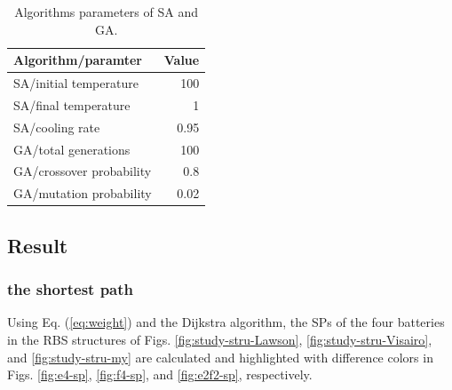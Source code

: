 \documentclass{article}
\begin{document}
\begin{table}[htbp]
  \centering
  \caption{Algorithms parameters of SA and GA.}
    \begin{tabular}{lr}
    \toprule
    Algorithm/paramter & \multicolumn{1}{l}{Value} \\
    \midrule
    SA/initial temperature & 100 \\
    SA/final temperature & 1 \\
    SA/cooling rate & 0.95 \\
    GA/total generations & 100 \\
    GA/crossover probability & 0.8 \\
    GA/mutation probability & 0.02 \\
    \bottomrule
    \end{tabular}
  \label{tab:algorithm-parameter}
\end{table}

\subsection{Result}

\subsubsection{the shortest path}

Using Eq. (\ref{eq:weight}) and the Dijkstra algorithm, the SPs of the four batteries in the RBS structures of Figs. \ref{fig:study-stru-Lawson}, \ref{fig:study-stru-Visairo}, and \ref{fig:study-stru-my} are calculated and highlighted with difference colors in Figs. \ref{fig:e4-sp}, \ref{fig:f4-sp}, and \ref{fig:e2f2-sp}, respectively.
\end{document}
